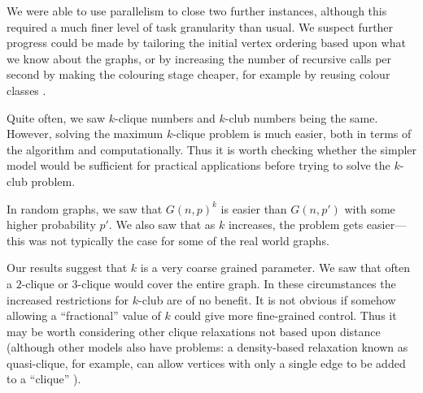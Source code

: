 \documentclass[letterpaper]{article}
\begin{document}
We were able to use parallelism to close two further instances, although this required a much finer
level of task granularity than usual.  We suspect further progress could be made by tailoring the
initial vertex ordering based upon what we know about the graphs, or by increasing the number of
recursive calls per second by making the colouring stage cheaper, for example by reusing colour
classes \cite{DBLP:conf/lion/NikolaevBS15}.

Quite often, we saw $k$-clique numbers and $k$-club numbers being the same. However, solving the
maximum $k$-clique problem is much easier, both in terms of the algorithm and computationally. Thus
it is worth checking whether the simpler model would be sufficient for practical applications before
trying to solve the $k$-club problem.

In random graphs, we saw that $G(n, p)^k$ is easier than $G(n, p')$ with some higher probability
$p'$. We also saw that as $k$ increases, the problem gets easier---this was not typically the case
for some of the real world graphs.

Our results suggest that $k$ is a very coarse grained parameter. We saw that often a $2$-clique or
$3$-clique would cover the entire graph. In these circumstances the increased restrictions for
$k$-club are of no benefit. It is not obvious if somehow allowing a ``fractional'' value of $k$
could give more fine-grained control. Thus it may be worth considering other clique relaxations not
based upon distance (although other models also have problems: a density-based relaxation known as
quasi-clique, for example, can allow vertices with only a single edge to be added to a ``clique''
\cite{Abello:2002}).



\end{document}

